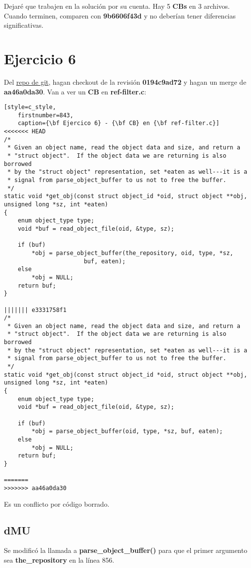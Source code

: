 Dejaré que trabajen en la solución por su cuenta. Hay 5 {\bf CBs} en 3 archivos. Cuando terminen, comparen
con {\bf 9b6606f43d} y no deberían tener diferencias significativas.

\section{Ejercicio 6}
\label{exercise_06}

Del \hyperref[git_repo]{repo de git}, hagan checkout de la revisión {\bf 0194c9ad72} y hagan un merge de {\bf aa46a0da30}.
Van a ver un {\bf CB} en {\bf ref-filter.c}:

\begin{lstlisting}[style=c_style,
	firstnumber=843,
	caption={\bf Ejercico 6} - {\bf CB} en {\bf ref-filter.c}]
<<<<<<< HEAD
/*
 * Given an object name, read the object data and size, and return a
 * "struct object".  If the object data we are returning is also borrowed
 * by the "struct object" representation, set *eaten as well---it is a
 * signal from parse_object_buffer to us not to free the buffer.
 */
static void *get_obj(const struct object_id *oid, struct object **obj, unsigned long *sz, int *eaten)
{
	enum object_type type;
	void *buf = read_object_file(oid, &type, sz);

	if (buf)
		*obj = parse_object_buffer(the_repository, oid, type, *sz,
					   buf, eaten);
	else
		*obj = NULL;
	return buf;
}

||||||| e3331758f1
/*
 * Given an object name, read the object data and size, and return a
 * "struct object".  If the object data we are returning is also borrowed
 * by the "struct object" representation, set *eaten as well---it is a
 * signal from parse_object_buffer to us not to free the buffer.
 */
static void *get_obj(const struct object_id *oid, struct object **obj, unsigned long *sz, int *eaten)
{
	enum object_type type;
	void *buf = read_object_file(oid, &type, sz);

	if (buf)
		*obj = parse_object_buffer(oid, type, *sz, buf, eaten);
	else
		*obj = NULL;
	return buf;
}

=======
>>>>>>> aa46a0da30
\end{lstlisting}

Es un conflicto por código borrado.

\subsection*{dMU}
Se modificó la llamada a {\bf parse\_object\_buffer()} para que el primer argumento sea {\bf the\_repository} en la línea 856.

